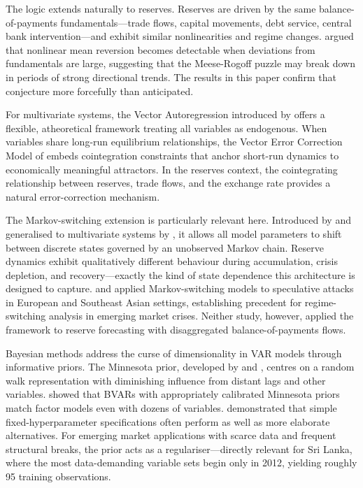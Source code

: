 \documentclass[12pt,a4paper]{article}
\begin{document}
The logic extends naturally to reserves. Reserves are driven by the same balance-of-payments fundamentals---trade flows, capital movements, debt service, central bank intervention---and exhibit similar nonlinearities and regime changes. \cite{TaylorPeelSarno2001} argued that nonlinear mean reversion becomes detectable when deviations from fundamentals are large, suggesting that the Meese-Rogoff puzzle may break down in periods of strong directional trends. The results in this paper confirm that conjecture more forcefully than anticipated.

For multivariate systems, the Vector Autoregression introduced by \cite{Sims1980} offers a flexible, atheoretical framework treating all variables as endogenous. When variables share long-run equilibrium relationships, the Vector Error Correction Model of \cite{Johansen1988,Johansen1991} embeds cointegration constraints that anchor short-run dynamics to economically meaningful attractors. In the reserves context, the cointegrating relationship between reserves, trade flows, and the exchange rate provides a natural error-correction mechanism.

The Markov-switching extension is particularly relevant here. Introduced by \cite{Hamilton1989} and generalised to multivariate systems by \cite{Krolzig1997}, it allows all model parameters to shift between discrete states governed by an unobserved Markov chain. Reserve dynamics exhibit qualitatively different behaviour during accumulation, crisis depletion, and recovery---exactly the kind of state dependence this architecture is designed to capture. \cite{Peria2002} and \cite{BrunettiMarianoScottiTan2007} applied Markov-switching models to speculative attacks in European and Southeast Asian settings, establishing precedent for regime-switching analysis in emerging market crises. Neither study, however, applied the framework to reserve forecasting with disaggregated balance-of-payments flows.

Bayesian methods address the curse of dimensionality in VAR models through informative priors. The Minnesota prior, developed by \cite{Litterman1986} and \cite{DoanLittermanSims1984}, centres on a random walk representation with diminishing influence from distant lags and other variables. \cite{Banbura2010} showed that BVARs with appropriately calibrated Minnesota priors match factor models even with dozens of variables. \cite{Carriero2015} demonstrated that simple fixed-hyperparameter specifications often perform as well as more elaborate alternatives. For emerging market applications with scarce data and frequent structural breaks, the prior acts as a regulariser---directly relevant for Sri Lanka, where the most data-demanding variable sets begin only in 2012, yielding roughly 95 training observations.
\end{document}
